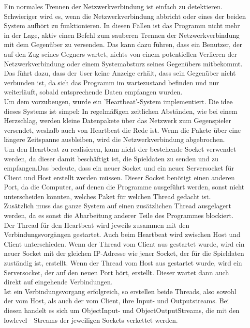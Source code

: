 \documentclass[12pt,a4paper]{article}
\begin{document}
Ein normales Trennen der Netzwerkverbindung ist einfach zu detektieren. Schwieriger wird es, wenn die Netzwerkverbindung abbricht oder eines der beiden System aufhört zu funktionieren. In diesen Fällen ist das Programm nicht mehr in der Lage, aktiv einen Befehl zum sauberen Trennen der Netzwerkverbindung mit dem Gegenüber zu versenden. Das kann dazu führen, dass ein Benutzer, der auf den Zug seines Gegners wartet, nichts von einem potentiellen Verlieren der Netzwerkverbindung oder einem Systemabsturz seines Gegenübers mitbekommt. Das führt  dazu, dass der User keine Anzeige erhält, dass sein Gegenüber nicht verbunden ist, da sich das Programm im wartezustand befinden und nur weiterläuft, sobald entsprechende Daten empfangen wurden.\\
Um dem vorzubeugen, wurde ein 'Heartbeat'-System implementiert. Die idee dieses Systems ist simpel: In regelmäßigen zeitlichen Abständen, wie bei einem Herzschlag, werden kleine Datenpakete über das Netzwerk zum Gegenspieler versendet, weshalb auch von Heartbeat die Rede ist. Wenn die Pakete über eine längere Zeitspanne ausbleiben, wird die Netzwerkverbindung abgebrochen.\\[3ex]
Um den Heartbeat zu realisieren, kann nicht der bestehende Socket verwendet werden, da dieser damit beschäftigt ist, die Spieldaten zu senden und zu empfangen.Das bedeute, dass ein neuer Socket und ein neuer Serversocket für Client und Host erstellt werden müssen. Dieser Socket benötigt einen anderen Port, da die Computer, auf denen die Programme ausgeführt werden, sonst nicht unterscheiden könnten, welches Paket für welchen Thread gedacht ist.\\ Zusätzlich muss das ganze System auf einen zusätzlichen Thread ausgelagert werden, da es sonst die Abarbeitung anderer Teile des Programmes blockiert. \\
Der Thread für den Heartbeat wird jeweils zusammen mit den Verbindungsvorgängen gestartet. Auch beim Heartbeat wird zwischen Host und Client unterschieden. 
Wenn der Thread vom Client aus gestartet wurde, wird ein neuer Socket mit der gleichen IP-Adresse wie jener Socket, der für die Spieldaten zuständig ist, erstellt. Wenn der Thread vom Host aus gestartet wurde, wird ein Serversocket, der auf den neuen Port hört, erstellt. Dieser wartet dann auch direkt auf eingehende Verbindungen. \\
Ist ein Verbindungsvorgang erfolgreich, so erstellen beide Threads, also sowohl der vom Host, als auch der vom Client, ihre Input- und Outputstreams. Bei diesen handelt es sich um ObjectInput- und ObjectOutputStreams, die mit den lowlevel - Streams der jeweiligen Sockets verkettet werden. \\
\end{document}
